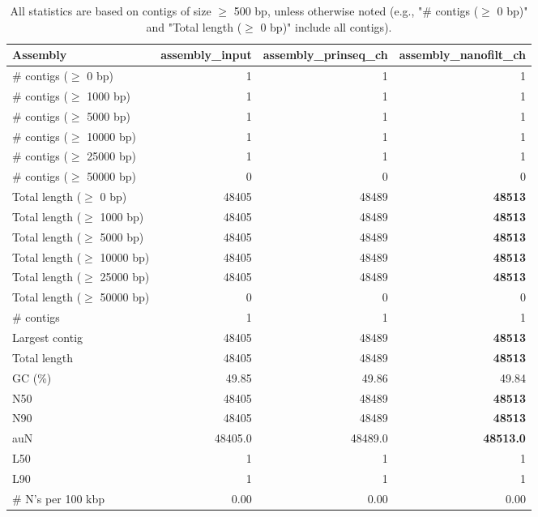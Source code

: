 \documentclass[12pt,a4paper]{article}
\begin{document}
\begin{table}[ht]
\begin{center}
\caption{All statistics are based on contigs of size $\geq$ 500 bp, unless otherwise noted (e.g., "\# contigs ($\geq$ 0 bp)" and "Total length ($\geq$ 0 bp)" include all contigs).}
\begin{tabular}{|l*{3}{|r}|}
\hline
Assembly & assembly\_input & assembly\_prinseq\_ch & assembly\_nanofilt\_ch \\ \hline
\# contigs ($\geq$ 0 bp) & 1 & 1 & 1 \\ \hline
\# contigs ($\geq$ 1000 bp) & 1 & 1 & 1 \\ \hline
\# contigs ($\geq$ 5000 bp) & 1 & 1 & 1 \\ \hline
\# contigs ($\geq$ 10000 bp) & 1 & 1 & 1 \\ \hline
\# contigs ($\geq$ 25000 bp) & 1 & 1 & 1 \\ \hline
\# contigs ($\geq$ 50000 bp) & 0 & 0 & 0 \\ \hline
Total length ($\geq$ 0 bp) & 48405 & 48489 & {\bf 48513} \\ \hline
Total length ($\geq$ 1000 bp) & 48405 & 48489 & {\bf 48513} \\ \hline
Total length ($\geq$ 5000 bp) & 48405 & 48489 & {\bf 48513} \\ \hline
Total length ($\geq$ 10000 bp) & 48405 & 48489 & {\bf 48513} \\ \hline
Total length ($\geq$ 25000 bp) & 48405 & 48489 & {\bf 48513} \\ \hline
Total length ($\geq$ 50000 bp) & 0 & 0 & 0 \\ \hline
\# contigs & 1 & 1 & 1 \\ \hline
Largest contig & 48405 & 48489 & {\bf 48513} \\ \hline
Total length & 48405 & 48489 & {\bf 48513} \\ \hline
GC (\%) & 49.85 & 49.86 & 49.84 \\ \hline
N50 & 48405 & 48489 & {\bf 48513} \\ \hline
N90 & 48405 & 48489 & {\bf 48513} \\ \hline
auN & 48405.0 & 48489.0 & {\bf 48513.0} \\ \hline
L50 & 1 & 1 & 1 \\ \hline
L90 & 1 & 1 & 1 \\ \hline
\# N's per 100 kbp & 0.00 & 0.00 & 0.00 \\ \hline
\end{tabular}
\end{center}
\end{table}
\end{document}
